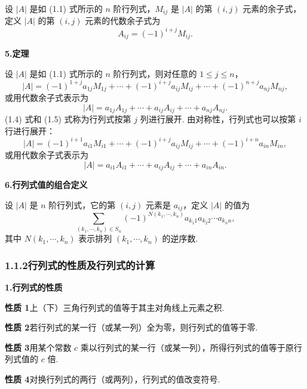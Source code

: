 \documentclass[UTF8,12pt,a4paper,fontset=fandol]{ctexart}
\begin{document}
设 $|A|$ 是如 (1.1) 式所示的 $n$ 阶行列式，$M_{ij}$ 是 $|A|$ 的第 $(i,j)$ 元素的余子式，定义 $|A|$ 的第 $(i,j)$ 元素的代数余子式为
\begin{equation}
A_{ij}=(-1)^{i+j}M_{ij}.
\tag{1.3}
\end{equation}

\noindent\textbf{5.\quad 定理}

设 $|A|$ 是如 (1.1) 式所示的 $n$ 阶行列式，则对任意的 $1\le j\le n$，
\begin{equation}
|A|=(-1)^{1+j}a_{1j}M_{1j}+\cdots+(-1)^{i+j}a_{ij}M_{ij}
+\cdots+(-1)^{n+j}a_{nj}M_{nj},
\tag{1.4}
\end{equation}
或用代数余子式表示为
\begin{equation}
|A|=a_{1j}A_{1j}+\cdots+a_{ij}A_{ij}+\cdots+a_{nj}A_{nj}.
\tag{1.5}
\end{equation}
(1.4) 式和 (1.5) 式称为行列式按第 $j$ 列进行展开. 由对称性，行列式也可以按第 $i$ 行进行展开：
\begin{equation}
|A|=(-1)^{i+1}a_{i1}M_{i1}+\cdots+(-1)^{i+j}a_{ij}M_{ij}
+\cdots+(-1)^{i+n}a_{in}M_{in},
\tag{1.6}
\end{equation}
或用代数余子式表示为
\begin{equation}
|A|=a_{i1}A_{i1}+\cdots+a_{ij}A_{ij}+\cdots+a_{in}A_{in}.
\tag{1.7}
\end{equation}

\noindent\textbf{6.\quad 行列式值的组合定义}

设 $|A|$ 是 $n$ 阶行列式，它的第 $(i,j)$ 元素是 $a_{ij}$，定义 $|A|$ 的值为
\[
\sum_{(k_1,\cdots,k_n)\in S_n}(-1)^{N(k_1,\cdots,k_n)}
a_{k_1 1}a_{k_2 2}\cdots a_{k_n n},
\]
其中 $N(k_1,\cdots,k_n)$ 表示排列 $(k_1,\cdots,k_n)$ 的逆序数.

\subsubsection*{1.1.2\quad 行列式的性质及行列式的计算}

\noindent\textbf{1.\quad 行列式的性质}

\noindent\textbf{性质 1}\quad 上（下）三角行列式的值等于其主对角线上元素之积.

\noindent\textbf{性质 2}\quad 若行列式的某一行（或某一列）全为零，则行列式的值等于零.

\noindent\textbf{性质 3}\quad 用某个常数 $c$ 乘以行列式的某一行（或某一列），所得行列式的值等于原行列式值的 $c$ 倍.

\noindent\textbf{性质 4}\quad 对换行列式的两行（或两列），行列式的值改变符号.
\end{document}
